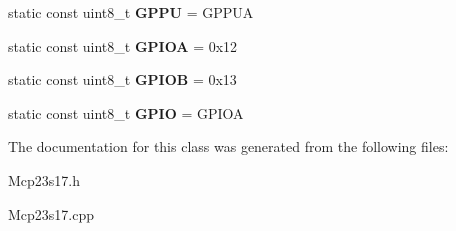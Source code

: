 \begin{DoxyCompactItemize}
\item 
\hypertarget{classMCP23S17_ae33660d68c052be00398ce25eddda821}{static const uint8\-\_\-t {\bfseries G\-P\-P\-U} = G\-P\-P\-U\-A}\label{classMCP23S17_ae33660d68c052be00398ce25eddda821}

\item 
\hypertarget{classMCP23S17_a35c11ee2e9c47694f0282d4f88454be8}{static const uint8\-\_\-t {\bfseries G\-P\-I\-O\-A} = 0x12}\label{classMCP23S17_a35c11ee2e9c47694f0282d4f88454be8}

\item 
\hypertarget{classMCP23S17_a7384014fa658f34e3a22260a202f15cc}{static const uint8\-\_\-t {\bfseries G\-P\-I\-O\-B} = 0x13}\label{classMCP23S17_a7384014fa658f34e3a22260a202f15cc}

\item 
\hypertarget{classMCP23S17_ab9813abef800a5f2c1b9acb74ef56c53}{static const uint8\-\_\-t {\bfseries G\-P\-I\-O} = G\-P\-I\-O\-A}\label{classMCP23S17_ab9813abef800a5f2c1b9acb74ef56c53}

\end{DoxyCompactItemize}


The documentation for this class was generated from the following files\-:\begin{DoxyCompactItemize}
\item 
Mcp23s17.\-h\item 
Mcp23s17.\-cpp\end{DoxyCompactItemize}
